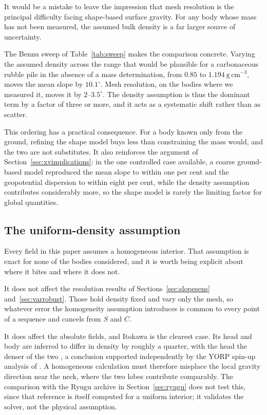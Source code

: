 It would be a mistake to leave the impression that mesh resolution is the
principal difficulty facing shape-based surface gravity. For any body whose
mass has not been measured, the assumed bulk density is a far larger source of
uncertainty.

The Bennu sweep of Table~\ref{tab:sweep} makes the comparison concrete. Varying
the assumed density across the range that would be plausible for a carbonaceous
rubble pile in the absence of a mass determination, from $0.85$ to
$1.194\ \mathrm{g\,cm^{-3}}$, moves the mean slope by $10.1^{\circ}$. Mesh
resolution, on the bodies where we measured it, moves it by $2$--$3.5^{\circ}$.
The density assumption is thus the dominant term by a factor of three or more,
and it acts as a systematic shift rather than as scatter.

This ordering has a practical consequence. For a body known only from the
ground, refining the shape model buys less than constraining the mass would,
and the two are not substitutes. It also reinforces the argument of
Section~\ref{sec:xvimplications}: in the one controlled case available, a
coarse ground-based model reproduced the mean slope to within one per cent and
the geopotential dispersion to within eight per cent, while the density
assumption contributes considerably more, so the shape model is rarely the
limiting factor for global quantities.

\subsection{The uniform-density assumption}
\label{sec:uniformdensity}

Every field in this paper assumes a homogeneous interior. That assumption is
exact for none of the bodies considered, and it is worth being explicit about
where it bites and where it does not.

It does not affect the resolution results of Sections~\ref{sec:slopesens}
and~\ref{sec:varrobust}. Those hold density fixed and vary only the mesh, so
whatever error the homogeneity assumption introduces is common to every point
of a sequence and cancels from $S$ and $C$.

It does affect the absolute fields, and Itokawa is the clearest case. Its head
and body are inferred to differ in density by roughly a quarter, with the head
the denser of the two \citep{kanamaru2019}, a conclusion supported
independently by the YORP spin-up analysis of \citet{lowry2014}. A homogeneous
calculation must therefore misplace the local gravity direction near the neck,
where the two lobes contribute comparably. The comparison with the Ryugu
archive in Section~\ref{sec:ryugu} does not test this, since that reference is
itself computed for a uniform interior; it validates the solver, not the
physical assumption.

